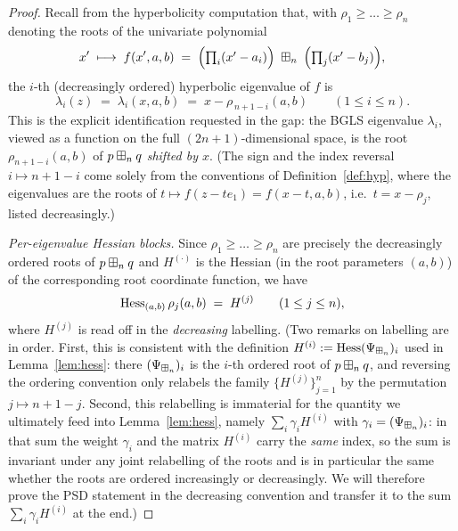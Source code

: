 \begin{proof}
Recall from the hyperbolicity computation that, with $\rho_1\ge\dots\ge\rho_n$
denoting the roots of the univariate polynomial
\[
x'\;\longmapsto\;f(x',a,b)\;=\;\Bigl(\textstyle\prod_i(x'-a_i)\Bigr)\;\boxplus_n\;
\Bigl(\textstyle\prod_j(x'-b_j)\Bigr),
\]
the $i$-th (decreasingly ordered) hyperbolic eigenvalue of $f$ is
\begin{equation}\label{eq:lambda-eq-rho}
\lambda_i(z)\;=\;\lambda_i(x,a,b)\;=\;x-\rho_{\,n+1-i}(a,b)\qquad(1\le i\le n).
\end{equation}
This is the explicit identification requested in the gap: the BGLS eigenvalue
$\lambda_i$, viewed as a function on the full $(2n{+}1)$-dimensional space, is
the root $\rho_{n+1-i}(a,b)$ of $p\boxplus_n q$ \emph{shifted by $x$}. (The sign
and the index reversal $i\mapsto n+1-i$ come solely from the conventions of
Definition~\ref{def:hyp}, where the eigenvalues are the roots of
$t\mapsto f(z-te_1)=f(x-t,a,b)$, i.e.\ $t=x-\rho_j$, listed decreasingly.)

\smallskip\noindent\emph{Per-eigenvalue Hessian blocks.}
Since $\rho_1\ge\dots\ge\rho_n$ are precisely the decreasingly ordered roots of
$p\boxplus_n q$ and $H^{(\cdot)}$ is the Hessian (in the root parameters $(a,b)$)
of the corresponding root coordinate function, we have
\[
\operatorname{Hess}_{(a,b)}\rho_j(a,b)\;=\;H^{(j)}\qquad(1\le j\le n),
\]
where $H^{(j)}$ is read off in the \emph{decreasing} labelling. (Two remarks on
labelling are in order. First, this is consistent with the definition
$H^{(i)}:=\operatorname{Hess}(\Psi_{\boxplus_n})_i$ used in Lemma~\ref{lem:hess}: there
$(\Psi_{\boxplus_n})_i$ is the $i$-th ordered root of $p\boxplus_n q$, and reversing
the ordering convention only relabels the family $\{H^{(j)}\}_{j=1}^n$ by the
permutation $j\mapsto n+1-j$. Second, this relabelling is immaterial for the
quantity we ultimately feed into Lemma~\ref{lem:hess}, namely
$\sum_i\gamma_i H^{(i)}$ with $\gamma_i=(\Psi_{\boxplus_n})_i$: in that sum the
weight $\gamma_i$ and the matrix $H^{(i)}$ carry the \emph{same} index, so the
sum is invariant under any joint relabelling of the roots and is in particular
the same whether the roots are ordered increasingly or decreasingly. We will
therefore prove the PSD statement in the decreasing convention and transfer it
to the sum $\sum_i\gamma_iH^{(i)}$ at the end.)


\end{proof}
